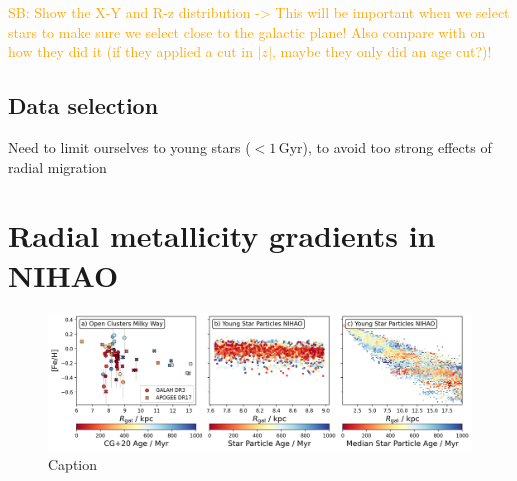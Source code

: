 \documentclass[fleqn,usenatbib]{mnras}
\newcommand{\SB}[1]{{\textcolor{orange}{SB: #1}}}
\begin{document}

%     

\SB{Show the X-Y and R-z distribution -> This will be important when we select stars to make sure we select close to the galactic plane! Also compare with \citet{Poggio2022} on how they did it (if they applied a cut in $\vert z \vert$, maybe they only did an age cut?)!}

\subsection{Data selection}

Need to limit ourselves to young stars ($< 1\,\mathrm{Gyr}$), to avoid too strong effects of radial migration \citep{Binney2008, Frankel2018}


\section{Radial metallicity gradients in NIHAO}
\label{sec:radial_metallicity_gradients}

\begin{figure}
    \centering
    \includegraphics[width=\textwidth]{figures/radial_metallicity_gradients_mw_vs_nihao.png}
    \caption{Caption}
    \label{fig:radial_metallicity_gradients_mw_vs_nihao}
\end{figure}
\end{document}
